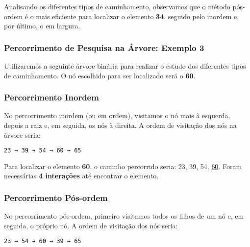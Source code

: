 \documentclass{article}
\begin{document}
Analisando os diferentes tipos de caminhamento, observamos que o método pós-ordem é o mais eficiente para localizar o elemento \textbf{34}, seguido pelo inordem e, por último, o em largura.
\begin{center}
\subsubsection{Percorrimento de Pesquisa na Árvore: Exemplo 3}

Utilizaremos a seguinte árvore binária para realizar o estudo dos diferentes tipos de caminhamento. O nó escolhido para ser localizado será o \textbf{60}.
\end{center}
\begin{center}
\end{center}

\subsubsection{Percorrimento Inordem}

No percorrimento inordem (ou em ordem), visitamos o nó mais à esquerda, depois a raiz e, em seguida, os nós à direita. A ordem de visitação dos nós na árvore seria:

\begin{verbatim}
23 → 39 → 54 → 60 → 65
\end{verbatim}

\noindent
Para localizar o elemento \textbf{60}, o caminho percorrido seria: 23, 39, 54, \underline{60}. Foram necessárias \textbf{4 interações} até encontrar o elemento.

\subsubsection{Percorrimento Pós-ordem}

No percorrimento pós-ordem, primeiro visitamos todos os filhos de um nó e, em seguida, o próprio nó. A ordem de visitação dos nós seria:

\begin{verbatim}
23 → 54 → 60 → 39 → 65
\end{verbatim}
\end{document}
